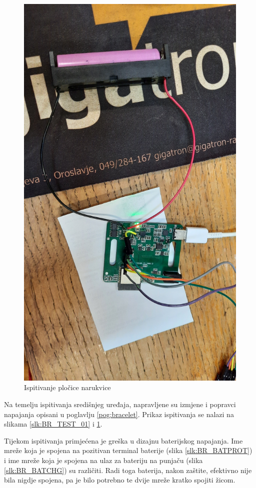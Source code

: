 \begin{figure}[htb]
    \centering
    \includegraphics[width=10 cm]{Figures/BR_TEST_01.jpg}
    \caption{Ispitivanje pločice narukvice}
    \label{slk:BR_TEST_02}
\end{figure}

Na temelju ispitivanja središnjeg uređaja, napravljene su izmjene i popravci napajanja opisani u poglavlju \ref{pog:bracelet}. Prikaz ispitivanja se nalazi na slikama \ref{slk:BR_TEST_01} i \ref{slk:BR_TEST_02}.

Tijekom ispitivanja primjećena je greška u dizajnu baterijskog napajanja. Ime mreže koja je spojena na pozitivan terminal baterije (slika \ref{slk:BR_BATPROT}) i ime mreže koja je spojena na ulaz za bateriju na punjaču (slika \ref{slk:BR_BATCHG}) su različiti. Radi toga baterija, nakon zaštite, efektivno nije bila nigdje spojena, pa je bilo potrebno te dvije mreže kratko spojiti žicom.

